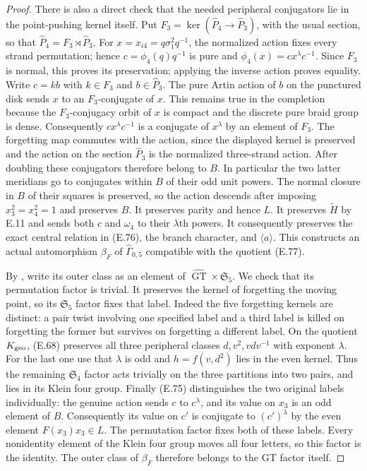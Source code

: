 \begin{proof}
There is also a direct check that the needed
peripheral conjugators lie in the point-pushing
kernel itself.  Put
$F_3=\ker(\widehat P_4\to\widehat P_3)$,
with the usual section, so that
$\widehat P_4=F_3\rtimes\widehat P_3$.
For $x=x_{i4}=q\sigma_1^2q^{-1}$, the
normalized action fixes every strand permutation;
hence $c=\phi_4(q)q^{-1}$ is pure and
$\phi_4(x)=cx^\lambda c^{-1}$.
Since $F_3$ is normal, this proves its preservation;
applying the inverse action proves equality.
Write $c=kb$ with $k\in F_3$ and
$b\in\widehat P_3$.  The pure Artin action
of $b$ on the punctured disk sends $x$ to
an $F_3$-conjugate of $x$.
This remains true in the completion because
the $F_3$-conjugacy orbit of $x$ is compact
and the discrete pure braid group is dense.
Consequently $cx^\lambda c^{-1}$ is a conjugate
of $x^\lambda$ by an element of $F_3$.
The forgetting map commutes with the action,
since the displayed kernel is preserved and
the action on the section $\widehat P_3$
is the normalized three-strand action.
After doubling these conjugators
therefore belong to $B$.  In particular the
two latter meridians go to conjugates within
$B$ of their odd unit powers.  The normal
closure in $B$ of their squares is preserved,
so the action descends after imposing
$x_3^2=x_4^2=1$ and preserves $B$.
It preserves parity and hence $L$.
It preserves $\widetilde H$ by E.11 and sends
both $c$ and $\omega_4$ to their
$\lambda$th powers.  It consequently preserves
the exact central relation in (E.76), the
branch character, and $\langle a\rangle$.
This constructs an actual automorphism
$\beta_F$ of $\widehat\Gamma_{0,5}$ compatible
with the quotient (E.77).

By \cite[Corollary 2.8(i)]{ET_HMM2022}, write
its outer class as an element of
$\widehat{\operatorname{GT}}\times\mathfrak S_5$.
We check that its permutation factor is
trivial.  It preserves the kernel of
forgetting the moving point, so its
$\mathfrak S_5$ factor fixes that label.
Indeed the five forgetting kernels are
distinct: a pair twist involving one
specified label and a third label is killed
on forgetting the former but survives on
forgetting a different label.
On the quotient $K_{\rm geo}$, (E.68)
preserves all three peripheral classes
$d,v^2,vdv^{-1}$ with exponent $\lambda$.
For the last one use that $\lambda$ is odd
and $h=f(v,d^2)$ lies in the even kernel.
Thus the remaining $\mathfrak S_4$ factor
acts trivially on the three partitions into
two pairs, and lies in its Klein four group.
Finally (E.75) distinguishes the two original
labels individually: the genuine action
sends $c$ to $c^\lambda$, and its value on
$x_3$ is an odd element of $B$.
Consequently its value on $c'$ is conjugate
to $(c')^\lambda$ by the even element
$F(x_3)x_3\in L$.
The permutation factor fixes both of these
labels.  Every nonidentity element of the
Klein four group moves all four letters,
so this factor is the identity.
The outer class of $\beta_F$ therefore
belongs to the GT factor itself.


\end{proof}
